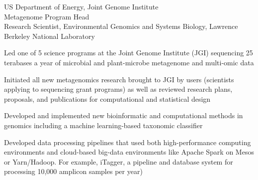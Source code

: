 \documentclass[12pt,letterpaper]{report}
\newcommand{\listitemspace}{0.15em}
\renewenvironment{itemize}
{\begin{list}{}{\setlength{\leftmargin}{0em}
            \setlength{\parskip}{0em}
            \setlength{\itemsep}{\listitemspace}
            \setlength{\parsep}{\listitemspace}}}
    {\end{list}}
\begin{document}
\begin{tablist}
        \item[2016--17] \tab US Department of Energy, Joint Genome Institute \\
                             Metagenome Program Head \\
                             Research Scientist, Environmental Genomics and Systems Biology, Lawrence Berkeley National Laboratory \\
                             \tab \begin{itemize}
                             		\item[$\bullet$] Led one of 5 science programs at the Joint Genome Institute (JGI) sequencing
								25 terabases a year of microbial and plant-microbe metagenome and multi-omic data
					\item[$\bullet$]Initiated all new metagenomics research brought to JGI by users (scientists applying to sequencing grant									programs) as well as reviewed research plans, proposals, and publications for computational and statistical 								design
					\item[$\bullet$] Developed and implemented new bioinformatic and computational methods in genomics including a machine 									learning-based taxonomic classifier
					\item[$\bullet$] Developed data processing pipelines that used both high-performance computing environments  and cloud-based
								big-data environments like Apache Spark on Mesos or Yarn/Hadoop. For example, iTagger, a pipeline and 								database system for processing 10,000 amplicon samples per year)
				\end{itemize}
                             

\end{tablist}
\end{document}
